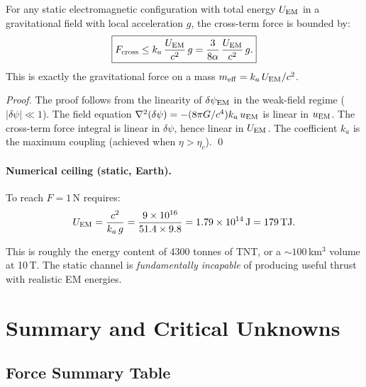\documentclass[11pt]{article}
\newcommand{\ka}{k_a}
\begin{document}
\begin{theorem}\label{thm:bound}
For any static electromagnetic configuration with total energy
$U_{\rm EM}$ in a gravitational field with local acceleration $g$,
the cross-term force is bounded by:
\begin{equation}
\boxed{F_{\rm cross} \leq \ka\,\frac{U_{\rm EM}}{c^2}\,g
  = \frac{3}{8\alpha}\,\frac{U_{\rm EM}}{c^2}\,g.}
\end{equation}
This is exactly the gravitational force on a mass $m_{\rm eff} = \ka\,U_{\rm EM}/c^2$.
\end{theorem}

\begin{proof}
The proof follows from the linearity of $\delta\psi_{\rm EM}$ in the
weak-field regime ($|\delta\psi| \ll 1$). The field equation
$\nabla^2(\delta\psi) = -(8\pi G/c^4)\ka\,u_{\rm EM}$ is linear in $u_{\rm EM}$.
The cross-term force integral is linear in $\delta\psi$, hence linear in
$U_{\rm EM}$. The coefficient $\ka$ is the maximum coupling (achieved when
$\eta > \eta_c$). \qed
\end{proof}

\paragraph{Numerical ceiling (static, Earth).}
To reach $F = 1$\,N requires:
\begin{equation}
U_{\rm EM} = \frac{c^2}{\ka\,g} = \frac{9 \times 10^{16}}{51.4 \times 9.8}
  = 1.79 \times 10^{14}\,\text{J} = 179\,\text{TJ}.
\end{equation}

This is roughly the energy content of 4300 tonnes of TNT, or a
$\sim 100$\,km$^3$ volume at 10\,T. The static channel is
\textit{fundamentally incapable} of producing useful thrust with
realistic EM energies.

\section{Summary and Critical Unknowns}\label{sec:summary}

\subsection{Force Summary Table}
\end{document}
